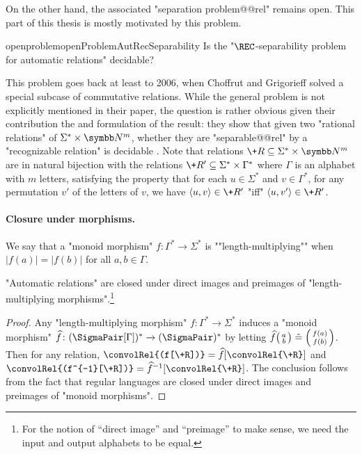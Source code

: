 On the other hand, the associated "separation problem@@rel" remains open.
This part of this thesis is mostly motivated by this problem.%
\begin{restatable}{openproblem}{openProblemAutRecSeparability}
	\label{opb:AUT-REC-separability}
	Is the "$\REC$-separability problem for automatic relations" decidable?
\end{restatable}

This problem goes back at least to 2006, when Choffrut and Grigorieff
solved a special subcase of commutative relations.
While the general problem is not explicitly mentioned in their paper,
the question is rather obvious given their contribution the and formulation of the result:
they show that given two "rational relations" of $\Sigma^*\times \N^m$, whether
they are "separable@@rel" by a "recognizable relation" is decidable
\cite[Theorem~1]{ChoffrutGrigorieff2006SeparabilityRationalRelations}.
Note that relations $\+R \subseteq \Sigma^*\times \N^m$ are in natural bijection
with the relations $\+R' \subseteq \Sigma^*\times \Gamma^*$ where $\Gamma$ is an alphabet
with $m$ letters, satisfying the property that for each $u \in \Sigma^*$ and $v \in \Gamma^*$,
for any permutation $v'$ of the letters of $v$, we have $\tup{u,v} \in \+R'$
"iff" $\tup{u,v'} \in \+R'$. 

\paragraph*{Closure under morphisms.}
We say that a "monoid morphism" $f\colon \Gamma^* \to \Sigma^*$ is \AP""length-multiplying""
when $|f(a)| = |f(b)|$ for all $a, b \in \Gamma$.
\begin{proposition}
	\AP\label{prop:automatic-closure-length-multiplying-morphism}
	"Automatic relations" are closed under direct images and preimages of "length-multiplying 
	morphisms".\footnote{For the notion of ``direct image'' and ``preimage'' to make sense, we need
	the input and output alphabets to be equal.}
\end{proposition}
\begin{proof}
	Any "length-multiplying morphism" $f\colon \Gamma^* \to \Sigma^*$ induces
	a "monoid morphism" $\widehat f\colon (\SigmaPair[\Gamma])^* \to (\SigmaPair)^*$ 
	by letting $\widehat f \pair{a}{b} \defeq \pair{f(a)}{f(b)}$.
	Then for any relation, $\convolRel{(f[\+R])} = \widehat f[\convolRel{\+R}]$
	and $\convolRel{(f^{-1}[\+R])} = \widehat f^{-1}[\convolRel{\+R}]$.
	The conclusion follows from the fact that regular languages are closed under
	direct images and preimages of "monoid morphisms".
\end{proof}

